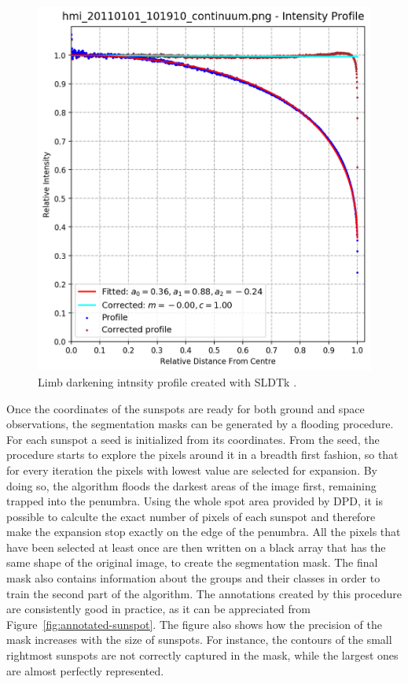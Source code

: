 \bigbreak
\begin{figure}[t]
    \centering
    \includegraphics[width=\textwidth]{./pictures/SLDTk}
    \caption{Limb darkening intnsity profile created with SLDTk \cite{sldtk}.}
    \label{fig:sldtk}
\end{figure}
\noindent Once the coordinates of the sunspots are ready for both ground and space observations, the segmentation masks can be generated by a flooding procedure. For each sunspot a seed is initialized from its coordinates. From the seed, the procedure starts to explore the pixels around it in a breadth first fashion, so that for every iteration the pixels with lowest value are selected for expansion. By doing so, the algorithm floods the darkest areas of the image first, remaining trapped into the penumbra. Using the whole spot area provided by DPD, it is possible to calculte the exact number of pixels of each sunspot and therefore make the expansion stop exactly on the edge of the penumbra. All the pixels that have been selected at least once are then written on a black array that has the same shape of the original image, to create the segmentation mask.
\bigbreak
\noindent The final mask also contains information about the groups and their classes in order to train the second part of the algorithm. The annotations created by this procedure are consistently good in practice, as it can be appreciated from Figure~\ref{fig:annotated-sunspot}. The figure also shows how the precision of the mask increases with the size of sunspots. For instance, the contours of the small rightmost sunspots are not correctly captured in the mask, while the largest ones are almost perfectly represented.
